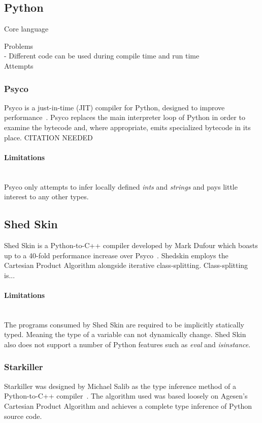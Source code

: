 \documentclass[12pt, titlepage]{article}
\begin{document}
\subsection{Python}
Core language

Problems \\
- Different code can be used during compile time and run time  \\

Attempts \\
\subsubsection{Psyco}
Psyco is a just-in-time (JIT) compiler for Python, designed to improve performance~\cite{psyco}. Psyco replaces the main interpreter loop of Python in order to examine the bytecode and, where appropriate, emits specialized bytecode in its place. CITATION NEEDED
\paragraph*{Limitations}\mbox{}\\
Psyco only attempts to infer locally defined \textit{ints} and \textit{strings} and pays little interest to any other types.

\subsection{Shed Skin}
Shed Skin is a Python-to-C++ compiler developed by Mark Dufour which boasts up to a 40-fold performance increase over Psyco~\cite{shedskin}. Shedskin employs the Cartesian Product Algorithm alongside iterative class-splitting. Class-splitting is...
\paragraph*{Limitations}\mbox{}\\
The programs consumed by Shed Skin are required to be implicitly statically typed. Meaning the type of a variable can not dynamically change. Shed Skin also does not support a number of Python features such as \textit{eval} and \textit{isinstance}.

\subsubsection{Starkiller}
Starkiller was designed by Michael Salib as the type inference method of a Python-to-C++ compiler~\cite{starkiller}. The algorithm used was based loosely on Agesen’s Cartesian Product Algorithm and achieves a complete type inference of Python source code.
\end{document}
